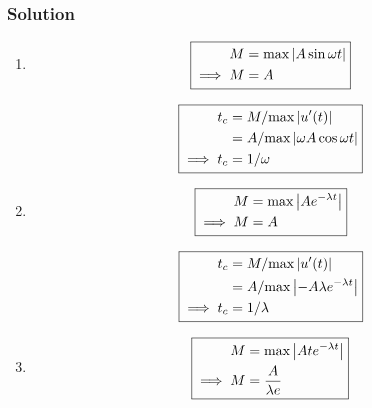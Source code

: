 \documentclass[12pt,twoside]{article}
\begin{document}
\subsubsection*{Solution}
\begin{enumerate}
\item
  \begin{equation*} \boxed{
    \begin{aligned}
      M &= \text{max}\left|{A\sin\omega t}\right| \\
      \implies M &= A \\
    \end{aligned}
    }
  \end{equation*}

  \begin{equation*} \boxed{
    \begin{aligned}
      t_c &= M/\text{max}\left|{u'(t)}\right| \\
      &= A/\text{max}\left|{\omega A \cos \omega t}\right| \\
      \implies t_c &= 1/\omega \\
    \end{aligned}
    }
  \end{equation*}
\item
  \begin{equation*} \boxed{
    \begin{aligned}
      M &= \text{max}\left|{Ae^{-\lambda t}}\right| \\
      \implies M &= A \\
    \end{aligned}
    }
  \end{equation*}

  \begin{equation*} \boxed{
    \begin{aligned}
      t_c &= M/\text{max}\left|{u'(t)}\right| \\
      &= A/\text{max}\left|{-A\lambda e^{-\lambda t}}\right| \\
      \implies t_c &= 1/\lambda \\
    \end{aligned}
    }
  \end{equation*}

\item
  \begin{equation*} \boxed{
      \begin{aligned}
        M &= \text{max}\left|{Ate^{-\lambda t}}\right| \\
        \implies M &= \frac{A}{\lambda e} \\
      \end{aligned}
    }
  \end{equation*}


\end{enumerate}
\end{document}
